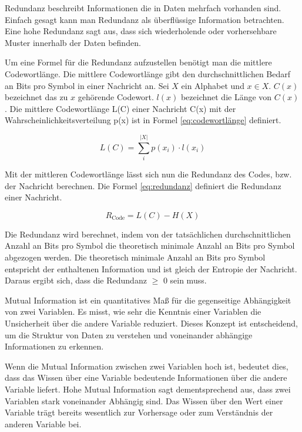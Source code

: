 \documentclass[conference]{IEEEtran}
\begin{document}
Redundanz beschreibt Informationen die in Daten mehrfach vorhanden sind. \cite{friedrichs}
Einfach gesagt kann man Redundanz als überflüssige Information betrachten.
Eine hohe Redundanz sagt aus, dass sich wiederholende oder vorhersehbare Muster innerhalb
der Daten befinden.

Um eine Formel für die Redundanz aufzustellen benötigt man die mittlere Codewortlänge.
Die mittlere Codewortlänge gibt den durchschnittlichen Bedarf an Bits pro Symbol in einer
Nachricht an.
Sei $X$ ein Alphabet und $x \in X$.
$C(x)$ bezeichnet das zu $x$ gehörende Codewort.
$l(x)$ bezeichnet die Länge von $C(x)$.
Die mittlere Codewortlänge L(C) einer Nachricht C(x) mit der Wahrscheinlichkeitsverteilung
p(x) ist in Formel \ref{eq:codewortlänge} definiert.

\begin{equation}
  \label{eq:codewortlänge}
  L(C) = \sum_{i}^{|X|} p(x_i) \cdot l(x_i)
\end{equation}

Mit der mittleren Codewortlänge lässt sich nun die Redundanz des Codes, bzw. der
Nachricht berechnen.
Die Formel \ref{eq:redundanz} definiert die Redundanz einer Nachricht.

\begin{equation}
  \label{eq:redundanz}
  R_{\text{Code}} = L(C) - H(X)
\end{equation}

Die Redundanz wird berechnet, indem von der tatsächlichen durchschnittlichen
Anzahl an Bits pro Symbol die theoretisch minimale Anzahl an Bits pro Symbol
abgezogen werden.
Die theoretisch minimale Anzahl an Bits pro Symbol entspricht der enthaltenen
Information und ist gleich der Entropie der Nachricht.
Daraus ergibt sich, dass die Redundanz $\geq$ 0 sein muss.

Mutual Information ist ein quantitatives Maß für die gegenseitige Abhängigkeit von zwei
Variablen. \cite{shannon}
Es misst, wie sehr die Kenntnis einer Variablen die Unsicherheit über die andere
Variable reduziert.
Dieses Konzept ist entscheidend, um die Struktur von Daten zu verstehen und
voneinander abhängige Informationen zu erkennen.

Wenn die Mutual Information zwischen zwei Variablen hoch ist, bedeutet dies,
dass das Wissen über eine Variable
bedeutende Informationen über die andere Variable liefert.
Hohe Mutual Information sagt dementsprechend aus, dass zwei Variablen stark voneinander
Abhängig sind.
Das Wissen über den Wert einer Variable trägt bereits wesentlich zur Vorhersage
oder zum Verständnis der anderen Variable bei.
\end{document}
